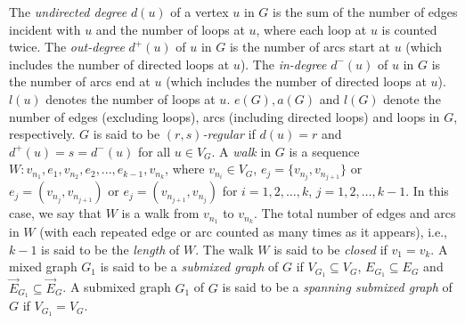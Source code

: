 \documentclass[12pt]{article}
\numberwithin{equation}{section}
\begin{document}
The \textit{undirected degree} $d(u)$ of  a vertex $u$ in $G$ is the sum of the number of edges incident with $u$ and the number of loops at $u$, where each loop at $u$ is counted twice. The \textit{out-degree} $d^+(u)$ of $u$ in $G$ is the number of arcs start at $u$ (which includes the number of directed loops at $u$). The \textit{in-degree} $d^-(u)$ of $u$ in $G$ is the number of arcs end at $u$ (which includes the number of directed loops at $u$). $l(u)$ denotes the number of loops at $u$. $e(G),a(G)$ and $l(G)$ denote the number of edges (excluding loops), arcs (including directed loops) and loops in $G$, respectively. $G$ is said to be \textit{$(r,s)$-regular} if $d(u)=r$ and $d^+(u)=s=d^-(u)$ for all $u\in V_G$. A \textit{walk} in $G$ is a sequence $W:v_{n_1},e_1,v_{n_2},e_2,...,e_{k-1},v_{n_k}$, where $v_{n_i}\in V_G$, $e_j=\{v_{n_j},v_{n_{j+1}}\}$ or $e_j=(v_{n_j},v_{n_{j+1}})$ or $e_j=(v_{n_{j+1}},v_{n_j})$ for $i=1,2,\ldots,k$, $j=1,2,\ldots,k-1$. In this case, we say that $W$ is a walk from $v_{n_1}$ to $v_{n_k}$. The total number of edges and arcs in $W$ (with each repeated edge or arc counted as many times as it appears), i.e., $k-1$ is said to be the \textit{length} of $W$. The walk $W$ is said to be \textit{closed} if $v_1=v_k$. A mixed graph $G_1$ is said to be a \textit{submixed graph} of $G$ if $V_{G_1}\subseteq V_G$, $E_{G_1}\subseteq E_G$ and $\vec{E}_{G_1}\subseteq \vec{E}_G$. %
A submixed graph $G_1$ of $G$ is said to be a \textit{spanning submixed graph} of $G$ if $V_{G_1}=V_G$.
\end{document}
